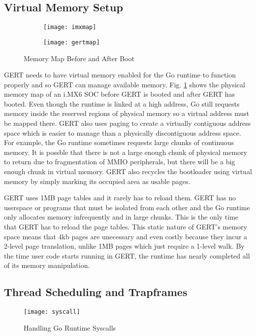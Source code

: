 \subsection{Virtual Memory Setup}
\begin{figure}[h]
  \begin{subfigure}[t!]{0.5\textwidth}
 \texttt{[image: imxmap]}
  \end{subfigure}
  \begin{subfigure}[t!]{0.5\textwidth}
 \texttt{[image: gertmap]}
  \end{subfigure}
  \caption{Memory Map Before and After Boot} \label{fig:gertmap}
\end{figure}

GERT needs to have virtual memory enabled for the Go runtime to function properly and so
GERT can manage available memory. Fig. \ref{fig:gertmap} shows the physical memory map
of an i.MX6 SOC before GERT is booted and after GERT has booted.
Even though the
runtime is linked at a high address, Go still requests memory inside the reserved regions of physical
memory so a virtual address must be mapped there. GERT also uses paging to create a virtually contiguous
address space which is easier to manage than a physically discontiguous address space. For example,
the Go runtime sometimes requests large chunks of continuous memory. It is possble that there is not
a large enough chunk of physical memory to return due to fragmentation of MMIO peripherals, but there
will be a big enough chunk in virtual memory. GERT also recycles the bootloader using virtual
memory by simply marking its occupied area as usable pages.

GERT uses 1MB page tables and it rarely has to reload them. GERT has no userspace or programs
that must be isolated from each other and the Go runtime only allocates memory infrequently
and in large chunks. This is the only time that GERT has to reload the page tables.
This static nature of GERT's memory space means that 4kb pages are unecessary
and even costly because they incur a 2-level page translation, unlike 1MB pages which just require
a 1-level walk. By the time user code starts running in GERT, the runtime has nearly completed
all of its memory manipulation.

\subsection{Thread Scheduling and Trapframes}
\begin{figure}[h]
\begin{center}
  \texttt{[image: syscall]}
\end{center}
  \caption{Handling Go Runtime Syscalls} \label{fig:syscall}
\end{figure}

